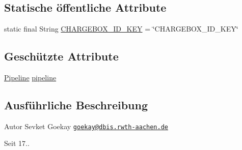 \subsection*{Statische öffentliche Attribute}
\begin{DoxyCompactItemize}
\item 
static final String \hyperlink{classde_1_1rwth_1_1idsg_1_1steve_1_1ocpp_1_1ws_1_1_abstract_web_socket_endpoint_a4ebea42decdb880f9f3a8a33e73cf4e7}{C\-H\-A\-R\-G\-E\-B\-O\-X\-\_\-\-I\-D\-\_\-\-K\-E\-Y} = \char`\"{}C\-H\-A\-R\-G\-E\-B\-O\-X\-\_\-\-I\-D\-\_\-\-K\-E\-Y\char`\"{}
\end{DoxyCompactItemize}
\subsection*{Geschützte Attribute}
\begin{DoxyCompactItemize}
\item 
\hyperlink{interfacede_1_1rwth_1_1idsg_1_1steve_1_1ocpp_1_1ws_1_1pipeline_1_1_pipeline}{Pipeline} \hyperlink{classde_1_1rwth_1_1idsg_1_1steve_1_1ocpp_1_1ws_1_1_abstract_web_socket_endpoint_ad702702e9550fea4384b0b0e8dbf05ff}{pipeline}
\end{DoxyCompactItemize}


\subsection{Ausführliche Beschreibung}
\begin{DoxyAuthor}{Autor}
Sevket Goekay \href{mailto:goekay@dbis.rwth-aachen.de}{\tt goekay@dbis.\-rwth-\/aachen.\-de} 
\end{DoxyAuthor}
\begin{DoxySince}{Seit}
17.. 
\end{DoxySince}


